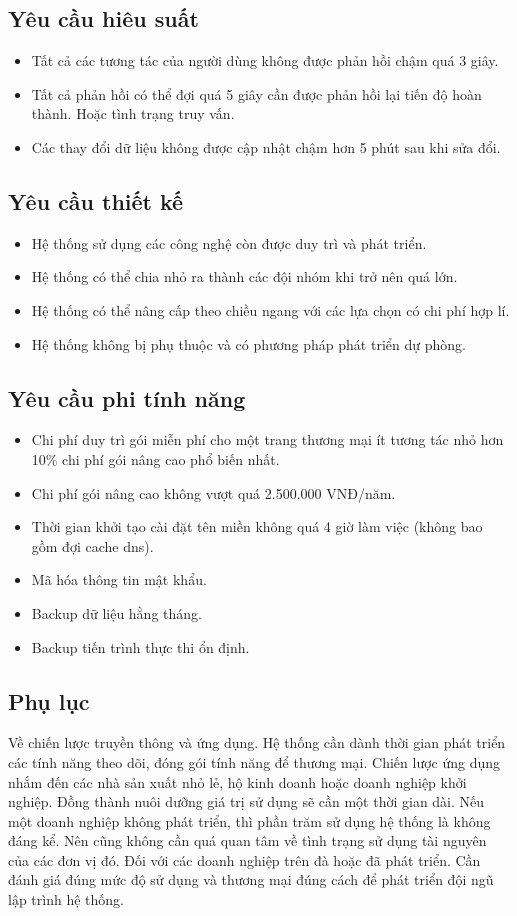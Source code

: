 \subsection{Yêu cầu hiêu suất}
\begin{itemize}
	\item Tất cả các tương tác của người dùng không được phản hồi chậm quá 3 giây.
	\item Tất cả phản hồi có thể đợi quá 5 giây cần được phản hồi lại tiến độ hoàn thành. Hoặc tình trạng truy vấn.
	\item Các thay đổi dữ liệu không được cập nhật chậm hơn 5 phút sau khi sửa đổi.
\end{itemize}

\subsection{Yêu cầu thiết kế}
\begin{itemize}
	\item Hệ thống sử dụng các công nghệ còn được duy trì và phát triển.
	\item Hệ thống có thể chia nhỏ ra thành các đội nhóm khi trở nên quá lớn.
	\item Hệ thống có thể nâng cấp theo chiều ngang với các lựa chọn có chi phí hợp lí.
	\item Hệ thống không bị phụ thuộc và có phương pháp phát triển dự phòng.
\end{itemize}

\subsection{Yêu cầu phi tính năng}
\begin{itemize}
	\item Chi phí duy trì gói miễn phí cho một trang thương mại ít tương tác nhỏ hơn 10\% chi phí gói nâng cao phổ biến nhất.
	\item Chi phí gói nâng cao không vượt quá 2.500.000 VNĐ/năm.
	\item Thời gian khởi tạo cài đặt tên miền không quá 4 giờ làm việc (không bao gồm đợi cache dns).
	\item Mã hóa thông tin mật khẩu.
	\item Backup dữ liệu hằng tháng.
	\item Backup tiến trình thực thi ổn định.
\end{itemize}

\subsection{Phụ lục}
Về chiến lược truyền thông và ứng dụng. Hệ thống cần dành thời gian phát triển các tính năng theo dõi, đóng gói tính năng để thương mại. Chiến lược ứng dụng nhắm đến các nhà sản xuất nhỏ lẻ, hộ kinh doanh hoặc doanh nghiệp khởi nghiệp. Đồng thành nuôi dưỡng giá trị sử dụng sẽ cần một thời gian dài. Nếu một doanh nghiệp không phát triển, thì phần trăm sử dụng hệ thống là không đáng kể. Nên cũng không cần quá quan tâm về tình trạng sử dụng tài nguyên của các đơn vị đó. Đối với các doanh nghiệp trên đà hoặc đã phát triển. Cần đánh giá đúng mức độ sử dụng và thương mại đúng cách để phát triển đội ngũ lập trình hệ thống.

